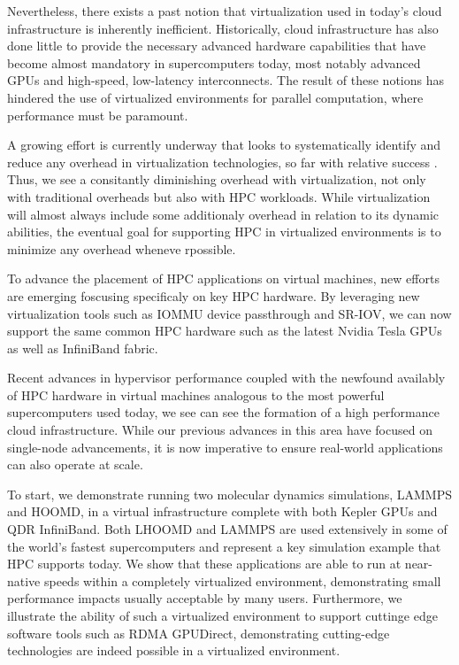 \documentclass[times,10pt,twocolumn,conference]{IEEEtran}
\begin{document}
Nevertheless, there exists a past notion that virtualization used in today's cloud infrastructure is inherently inefficient.  Historically, cloud infrastructure has also done little to provide the necessary advanced hardware capabilities that have become almost mandatory in supercomputers today, most notably advanced GPUs and high-speed, low-latency interconnects.  The result of these notions has hindered the use of virtualized environments for parallel computation, where performance must be paramount.

A growing effort is currently underway that looks to systematically identify and reduce any overhead in virtualization technologies, so far with relative success \cite{Younge2011cloud, Lukoviak}.  Thus, we see a consitantly diminishing overhead with virtualization, not only with traditional overheads \cite{} but also with HPC workloads.  While virtualization will almost always include some additionaly overhead in relation to its dynamic abilities, the eventual goal for supporting HPC in virtualized environments  is to minimize any overhead wheneve rpossible.
 
To advance the placement of HPC applications on virtual machines, new efforts are emerging foscusing specificaly on key HPC hardware. By leveraging new virtualization tools such as IOMMU device passthrough and SR-IOV, we can now support the same common HPC hardware such as the latest Nvidia Tesla GPUs \cite{younge2014}  as well as InfiniBand fabric\cite{panda}.  


Recent advances in hypervisor performance  \cite{Younge2011cloud} coupled with the newfound availably of HPC hardware in virtual machines analogous to the most powerful supercomputers used today, we see can see the formation of a high performance cloud infrastructure. While our previous advances in this area have focused on single-node advancements, it is now imperative to ensure real-world applications can also operate at scale. 

To start, we demonstrate running two molecular dynamics simulations, LAMMPS and HOOMD, in a virtual infrastructure complete with both Kepler GPUs and QDR InfiniBand.  Both LHOOMD and LAMMPS are used extensively in some of the world's fastest supercomputers and represent a key simulation example that HPC supports today.  We show that these applications are able to run at near-native speeds within a completely virtualized environment, demonstrating small performance impacts usually acceptable by many users. Furthermore, we illustrate the ability of such a virtualized environment to support cuttinge edge software tools such as RDMA GPUDirect, demonstrating cutting-edge technologies are indeed possible in a virtualized environment. 
\end{document}
